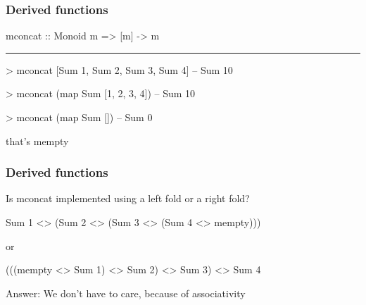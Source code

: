 \documentclass[UKenglish,usenames,dvipsnames,svgnames,table,aspectratio=169,mathserif]{beamer}
\begin{document}
\begin{frame}[fragile]
\frametitle{Derived functions}
\begin{center}
\begin{minipage}{0.6\textwidth}
\begin{haskellcode}
mconcat :: Monoid m => [m] -> m

\end{haskellcode}

\pause
\hrule

\begin{haskellcode}
> mconcat [Sum 1, Sum 2, Sum 3, Sum 4]
-- Sum 10
\end{haskellcode}

\pause

\begin{haskellcode}
> mconcat (map Sum [1, 2, 3, 4])
-- Sum 10
\end{haskellcode}

\pause

\begin{haskellcode}
> mconcat (map Sum [])
-- Sum 0
\end{haskellcode}
that's mempty
\end{minipage}
\end{center}
\end{frame}


\begin{frame}[fragile]
\frametitle{Derived functions}
\begin{center}
\begin{minipage}{0.6\textwidth}

Is mconcat implemented using a left fold or a right fold?

\begin{haskellcode}
Sum 1 <> (Sum 2 <> (Sum 3 <> (Sum 4 <> mempty)))
\end{haskellcode}

or

\begin{haskellcode}
(((mempty <> Sum 1) <> Sum 2) <> Sum 3) <> Sum 4
\end{haskellcode}

\bigskip

Answer: We don't have to care, because of associativity

\end{minipage}
\end{center}
\end{frame}
\end{document}
